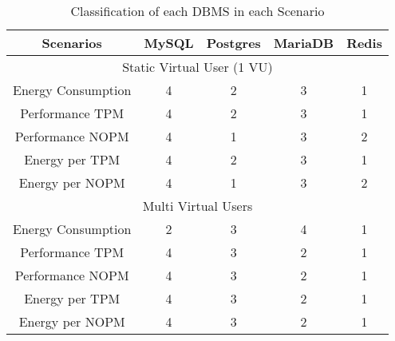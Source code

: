 \begin{table}[H]
\centering
\begin{tabular}{|c|c|c|c|c|}
\hline
Scenarios          & \multicolumn{1}{l|}{MySQL} & \multicolumn{1}{l|}{Postgres} & \multicolumn{1}{l|}{MariaDB} & Redis \\ \hline
\multicolumn{5}{|c|}{Static Virtual User (1 VU)}                                                                       \\ \hline
Energy Consumption & 4                          & 2                             & 3                            & 1     \\ \hline
Performance TPM    & 4                          & 2                             & 3                            & 1     \\ \hline
Performance NOPM   & 4                          & 1                             & 3                            & 2     \\ \hline
Energy per TPM     & 4                          & 2                             & 3                            & 1     \\ \hline
Energy per NOPM    & 4                          & 1                             & 3                            & 2     \\ \hline
\multicolumn{5}{|c|}{Multi Virtual Users}                                                                             \\ \hline
Energy Consumption & 2                          & 3                             & 4                             & 1     \\ \hline
Performance TPM    & 4                          & 3                             & 2                            & 1     \\ \hline
Performance NOPM   & 4                          & 3                             & 2                            & 1     \\ \hline
Energy per TPM     & 4                          & 3                             & 2                            & 1     \\ \hline
Energy per NOPM    & 4                          & 3                             & 2                            & 1     \\ \hline
\end{tabular}
\caption{Classification of each DBMS in each Scenario}
\label{tb:conclusion}
\end{table}